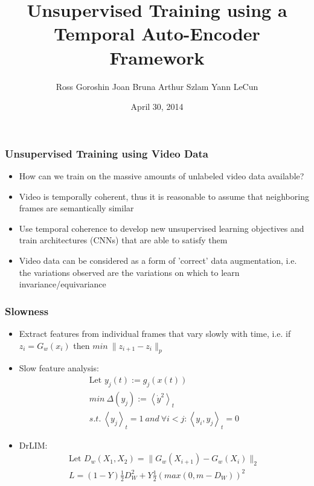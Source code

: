 \documentclass{beamer}
\title{Unsupervised Training using a Temporal Auto-Encoder Framework}
\date{April 30, 2014}
\author{Ross Goroshin \hspace{0.20cm} Joan Bruna \hspace{0.20cm} Arthur Szlam \hspace{0.20cm} Yann LeCun}
\begin{document}
\begin{frame}
\titlepage
\end{frame}

\begin{frame}
\frametitle{Unsupervised Training using Video Data}  
\begin{center}
\begin{itemize} 
\item How can we train on the massive amounts of unlabeled video data available? 
\item Video is temporally coherent, thus it is reasonable to assume that neighboring frames are semantically similar
\item Use temporal coherence to develop new unsupervised learning objectives and train architectures (CNNs) that are able to satisfy them  
\item Video data can be considered as a form of 'correct' data augmentation, i.e. the variations observed are the variations on which to learn invariance/equivariance 
\end{itemize} 
\end{center}
\end{frame}

\begin{frame}
\frametitle{Slowness}  
\begin{center}
\begin{itemize} 
\item Extract features from individual frames that vary slowly with time, i.e. if $z_i = G_w(x_i)$ then $min~\|z_{i+1} - z_i\|_p$ 
\item Slow feature analysis: 
\begin{eqnarray} 
\nonumber 
&\text{Let }y_j(t):=g_j(x(t))&\\
\nonumber 
&min~\Delta(y_j):= \left <\dot y^2 \right >_t& \\
\nonumber
&s.t.~ \left <y_j \right >_t = 1 ~and~ \forall i<j: \left<y_i,y_j\right >_t = 0&
\end{eqnarray}
\item DrLIM: 
\begin{eqnarray} 
\nonumber
\text{Let } D_w(X_1, X_2) = \|G_w(X_{i+1})-G_w(X_i)\|_2 \\
\nonumber 
L = (1-Y)\frac{1}{2}D_W^2 + Y \frac{1}{2}(max(0,m-D_W))^2
\end{eqnarray} 
\end{itemize}
\end{center}
\end{frame}
\end{document}

